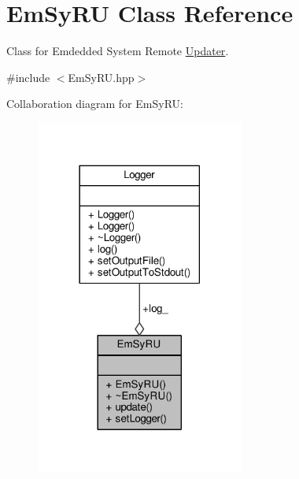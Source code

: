 \hypertarget{classEmSyRU}{\section{Em\-Sy\-R\-U Class Reference}
\label{classEmSyRU}
}


Class for Emdedded System Remote \hyperlink{classUpdater}{Updater}.  




{\ttfamily \#include $<$Em\-Sy\-R\-U.\-hpp$>$}



Collaboration diagram for Em\-Sy\-R\-U\-:
\nopagebreak
\begin{figure}[H]
\begin{center}
\leavevmode
\includegraphics[width=194pt]{classEmSyRU__coll__graph}
\end{center}
\end{figure}
